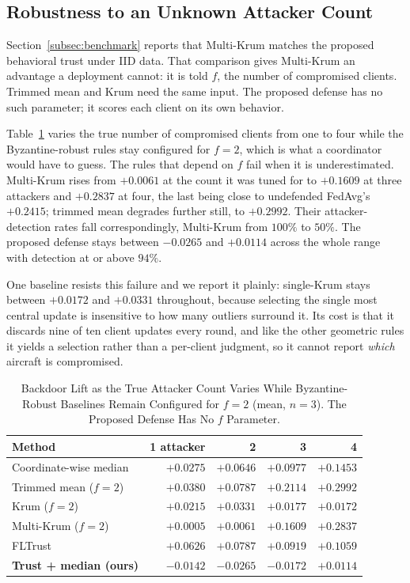 \documentclass[journal]{IEEEtran}
\begin{document}
\subsection{Robustness to an Unknown Attacker Count}
\label{subsec:fcount}
Section~\ref{subsec:benchmark} reports that Multi-Krum matches the proposed behavioral trust under IID data. That comparison gives Multi-Krum an advantage a deployment cannot: it is told $f$, the number of compromised clients. Trimmed mean and Krum need the same input. The proposed defense has no such parameter; it scores each client on its own behavior.

Table~\ref{tab:fcount} varies the true number of compromised clients from one to four while the Byzantine-robust rules stay configured for $f = 2$, which is what a coordinator would have to guess. The rules that depend on $f$ fail when it is underestimated. Multi-Krum rises from $+0.0061$ at the count it was tuned for to $+0.1609$ at three attackers and $+0.2837$ at four, the last being close to undefended FedAvg's $+0.2415$; trimmed mean degrades further still, to $+0.2992$. Their attacker-detection rates fall correspondingly, Multi-Krum from $100\%$ to $50\%$. The proposed defense stays between $-0.0265$ and $+0.0114$ across the whole range with detection at or above $94\%$.

One baseline resists this failure and we report it plainly: single-Krum stays between $+0.0172$ and $+0.0331$ throughout, because selecting the single most central update is insensitive to how many outliers surround it. Its cost is that it discards nine of ten client updates every round, and like the other geometric rules it yields a selection rather than a per-client judgment, so it cannot report \emph{which} aircraft is compromised.

\begin{table}[!t]
\renewcommand{\arraystretch}{1.2}
\caption{Backdoor Lift as the True Attacker Count Varies While Byzantine-Robust Baselines Remain Configured for $f=2$ (mean, $n=3$). The Proposed Defense Has No $f$ Parameter.}
\label{tab:fcount}
\centering
\footnotesize
\setlength{\tabcolsep}{4pt}
\begin{tabular}{@{}l rrrr@{}}
\toprule
\textbf{Method} & \textbf{1 attacker} & \textbf{2} & \textbf{3} & \textbf{4} \\
\midrule
Coordinate-wise median   & $+0.0275$ & $+0.0646$ & $+0.0977$ & $+0.1453$ \\
Trimmed mean ($f{=}2$)   & $+0.0380$ & $+0.0787$ & $+0.2114$ & $+0.2992$ \\
Krum ($f{=}2$)           & $+0.0215$ & $+0.0331$ & $+0.0177$ & $+0.0172$ \\
Multi-Krum ($f{=}2$)     & $+0.0005$ & $+0.0061$ & $+0.1609$ & $+0.2837$ \\
FLTrust                  & $+0.0626$ & $+0.0787$ & $+0.0919$ & $+0.1059$ \\
\textbf{Trust + median (ours)} & $\mathbf{-0.0142}$ & $\mathbf{-0.0265}$ & $\mathbf{-0.0172}$ & $\mathbf{+0.0114}$ \\
\bottomrule
\end{tabular}
\end{table}
\end{document}
